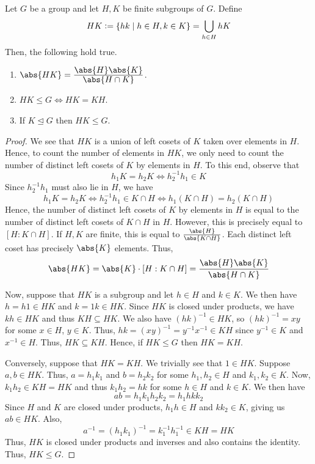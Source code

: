 \begin{prop} \label{prop:HK}
    Let $G$ be a group and let $H,K$ be finite subgroups of $G$. Define
    \[
        HK \vcentcolon= \left\{ hk \mid h \in H, k \in K \right\} = \bigcup_{h \in H} hK
    \]  
    Then, the following hold true.
    \begin{enumerate}
        \item $\abs{HK} = \ddfrac{\abs{H}\abs{K}}{\abs{H\cap K}}$.
        \item $HK \leq G \iff HK = KH$.
        \item If $K \trianglelefteq G$ then $HK \leq G$.
    \end{enumerate}
\end{prop}
\begin{proof}
    We see that $HK$ is a union of left cosets of $K$ taken over elements in $H$. Hence, to count the number of elements in $HK$, we only need to count the number of distinct left cosets of $K$ by elements in $H$. To this end, observe that
    \[
        h_1K = h_2K \iff h_2^{-1}h_1 \in K 
    \]
    Since $h_2^{-1}h_1$ must also lie in $H$, we have
    \[
        h_1K = h_2K \iff h_2^{-1}h_1 \in K \cap H \iff h_1 (K \cap H) = h_2(K \cap H)
    \]
    Hence, the number of distinct left cosets of $K$ by elements in $H$ is equal to the number of distinct left cosets of $K\cap H$ in $H$. However, this is precisely equal to $[H:K\cap H]$. If $H,K$ are finite, this is equal to $\frac{\abs{H}}{\abs{K\cap H}}$. Each distinct left coset has precisely $\abs{K}$ elements. Thus, 
    \[
        \abs{HK} = \abs{K} \cdot [H:K\cap H] = \frac{\abs{H}\abs{K}}{\abs{H\cap K}}
    \]
    
    \medskip
    
    Now, suppose that $HK$ is a subgroup and let $h \in H$ and $k \in K$. We then have $h = h1 \in HK$ and $k = 1k \in HK$. Since $HK$ is closed under products, we have $kh \in HK$ and thus $KH \subseteq HK$. We also have $(hk)^{-1} \in HK$, so $(hk)^{-1} = xy$ for some $x\in H$, $y \in K$. Thus, $hk = (xy)^{-1} = y^{-1}x^{-1} \in KH$ since $y^{-1} \in K$ and $x^{-1} \in H$. Thus, $HK \subseteq KH$. Hence, if $HK \leq G$ then $HK = KH$. 
    
    \medskip
    
    Conversely, suppose that $HK = KH$. We trivially see that $1 \in HK$. Suppose $a,b \in HK$. Thus, $a = h_1k_1$ and $b = h_2k_2$ for some $h_1,h_2 \in H$ and $k_1,k_2 \in K$. Now, $k_1h_2 \in KH = HK$ and thus $k_1h_2 = hk$ for some $h \in H$ and $k \in K$. We then have
    \[
        ab = h_1k_1h_2k_2 = h_1hkk_2
    \]  
    Since $H$ and $K$ are closed under products, $h_1h \in H$ and $kk_2 \in K$, giving us $ab \in HK$. Also,
    \[
        a^{-1} = (h_1k_1)^{-1} = k_1^{-1}h_1^{-1} \in KH = HK
    \]
    Thus, $HK$ is closed under products and inverses and also contains the identity. Thus, $HK \leq G$.
    

\end{proof}
